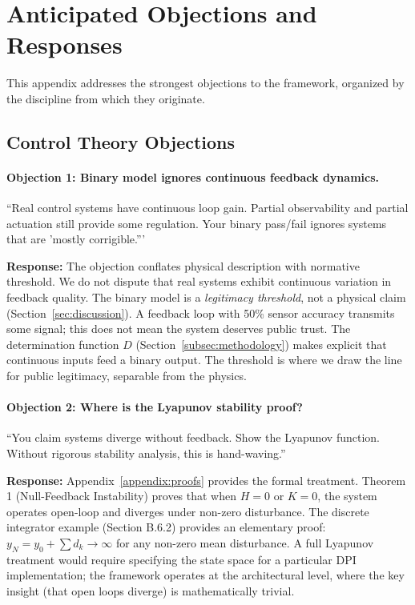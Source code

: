 \documentclass{article}
\begin{document}
\section{Anticipated Objections and Responses}
\label{appendix:objections}

This appendix addresses the strongest objections to the framework, organized by the discipline from which they originate.

\subsection{Control Theory Objections}

\paragraph{Objection 1: Binary model ignores continuous feedback dynamics.}
``Real control systems have continuous loop gain. Partial observability and partial actuation still provide some regulation. Your binary pass/fail ignores systems that are 'mostly corrigible.'''

\textbf{Response:} The objection conflates physical description with normative threshold. We do not dispute that real systems exhibit continuous variation in feedback quality. The binary model is a \textit{legitimacy threshold}, not a physical claim (Section~\ref{sec:discussion}). A feedback loop with 50\% sensor accuracy transmits some signal; this does not mean the system deserves public trust. The determination function $D$ (Section~\ref{subsec:methodology}) makes explicit that continuous inputs feed a binary output. The threshold is where we draw the line for public legitimacy, separable from the physics.

\paragraph{Objection 2: Where is the Lyapunov stability proof?}
``You claim systems diverge without feedback. Show the Lyapunov function. Without rigorous stability analysis, this is hand-waving.''

\textbf{Response:} Appendix~\ref{appendix:proofs} provides the formal treatment. Theorem 1 (Null-Feedback Instability) proves that when $H=0$ or $K=0$, the system operates open-loop and diverges under non-zero disturbance. The discrete integrator example (Section B.6.2) provides an elementary proof: $y_N = y_0 + \sum d_k \to \infty$ for any non-zero mean disturbance. A full Lyapunov treatment would require specifying the state space for a particular DPI implementation; the framework operates at the architectural level, where the key insight (that open loops diverge) is mathematically trivial.
\end{document}
